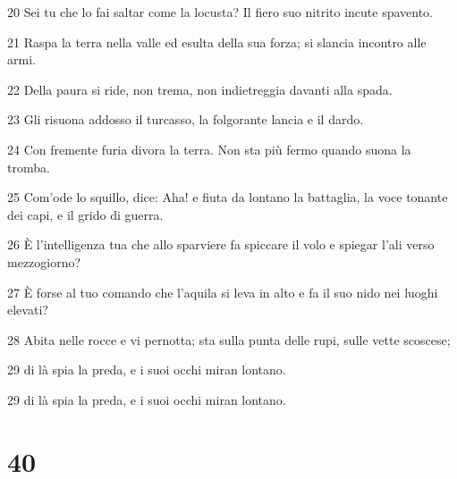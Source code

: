 \par 20 Sei tu che lo fai saltar come la locusta? Il fiero suo nitrito incute spavento.
\par 21 Raspa la terra nella valle ed esulta della sua forza; si slancia incontro alle armi.
\par 22 Della paura si ride, non trema, non indietreggia davanti alla spada.
\par 23 Gli risuona addosso il turcasso, la folgorante lancia e il dardo.
\par 24 Con fremente furia divora la terra. Non sta più fermo quando suona la tromba.
\par 25 Com'ode lo squillo, dice: Aha! e fiuta da lontano la battaglia, la voce tonante dei capi, e il grido di guerra.
\par 26 È l'intelligenza tua che allo sparviere fa spiccare il volo e spiegar l'ali verso mezzogiorno?
\par 27 È forse al tuo comando che l'aquila si leva in alto e fa il suo nido nei luoghi elevati?
\par 28 Abita nelle rocce e vi pernotta; sta sulla punta delle rupi, sulle vette scoscese;
\par 29 di là spia la preda, e i suoi occhi miran lontano.
\par 29 di là spia la preda, e i suoi occhi miran lontano.

\chapter{40}

